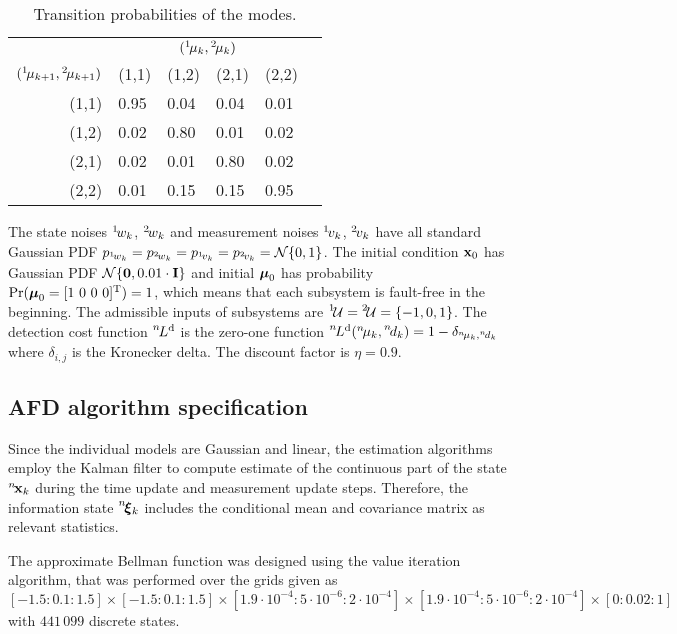 \documentclass[conference,10pt]{IEEEtran}
\def\ist{\prescript{1\!}{}}
\def\iind{\prescript{2\!}{}}
\def\nth{\prescript{n\!}{}}
\begin{document}
\begin{table}[ht]
\renewcommand{\arraystretch}{1.2}
\centering 
  \caption{Transition probabilities of the modes.}\label{tab:modeTran}
  \begin{tabular}{rlllll}\toprule
     & \multicolumn{4}{c}{$(\ist{\mu}_{k},\iind{\mu}_{k})$}\\
    \cmidrule{2-5}
    $(\ist{\mu}_{k+1},\iind{\mu}_{k+1})$ & (1,1) &  (1,2) & (2,1) & (2,2)\\\midrule 
    (1,1) & 0.95 & 0.04 & 0.04 & 0.01 \\
    (1,2) & 0.02 & 0.80 & 0.01 & 0.02 \\
    (2,1) & 0.02 & 0.01 & 0.80 & 0.02 \\
    (2,2) & 0.01 & 0.15 & 0.15 & 0.95 \\\bottomrule
  \end{tabular}
\end{table}
The state noises $\ist{w_{k}}$, $\iind{w_{k}}$ and measurement noises $\ist{v_{k}}$, $\iind{v_{k}}$ have all standard Gaussian PDF $p_{\ist{w_{k}}}=p_{\iind{w_{k}}}=p_{\ist{v_{k}}}=p_{\iind{v_{k}}} = \mcN\{0,1\}$. 
The initial condition $\mathbf{x}_{0}$ has Gaussian PDF $\mathcal{N}\{\mathbf{0},0.01\cdot\mathbf{I}\}$ and initial $\boldsymbol{\mu}_{0}$ has probability $\Pr(\boldsymbol{\mu}_{0}=[1\ 0\ 0\ 0]^{\text{T}})=1$, which means that each subsystem is fault-free in
the beginning. 
The admissible inputs of subsystems are $\ist{\mcU}=\iind{\mcU} = \{-1,0,1\}$. 
The detection cost function $\nth{L}^{\mathrm{d}}$ is the zero-one function $\nth{L}^{\mathrm{d}}(\nth{\mu}_{k},\nth{d}_{k}) = 1-\delta_{\nth{\mu}_{k},\nth{d}_{k}}$ where $\delta_{i,j}$ is the Kronecker delta. The discount factor is $\eta=0.9$.

\subsection{AFD algorithm specification}\label{sec:AFDAlgorithmSpecification}
Since the individual models are Gaussian and linear, the estimation algorithms employ the Kalman filter to compute estimate of the continuous part of the state $\nth{\bfx}_k$ during the time update and  measurement update steps. 
Therefore, the information state $\nth{\bfxi}_{k}$ includes the conditional mean and covariance matrix as relevant statistics.

The approximate Bellman function was designed using the value iteration algorithm, that was performed over the grids given as
$[-1.5:0.1:1.5]\times[-1.5:0.1:1.5]\times[1.9\cdot10^{-4}:5\cdot10^{-6}:2\cdot10^{-4}]\times[1.9\cdot10^{-4}:5\cdot10^{-6}:2\cdot10^{-4}]\times[0:0.02:1]$
with $441\,099$ discrete states. 
\end{document}
